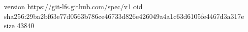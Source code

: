 version https://git-lfs.github.com/spec/v1
oid sha256:29ba2bf63e77d0563b786ce46733d826e426049a4a1c63d6105fe4467d3a317e
size 43840
